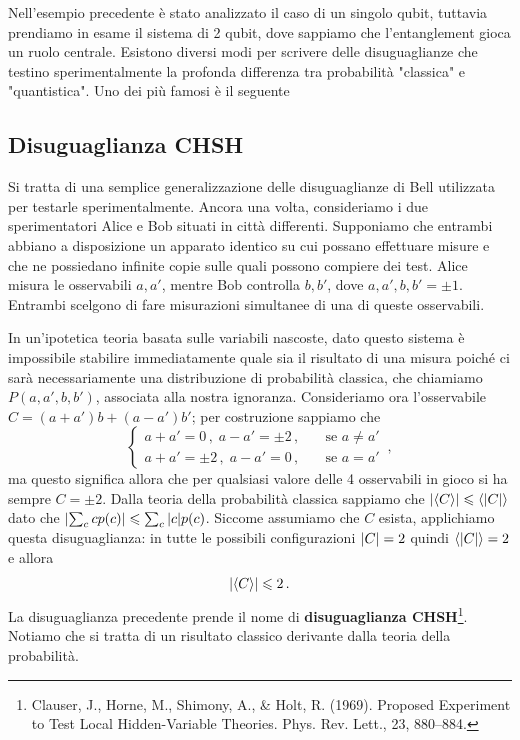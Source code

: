\noindent Nell'esempio precedente è stato analizzato il caso di un singolo qubit, tuttavia prendiamo in esame il sistema di 2 qubit, dove sappiamo che l'entanglement gioca un ruolo centrale. Esistono diversi modi per scrivere delle disuguaglianze che testino sperimentalmente la profonda differenza tra probabilità "classica" e "quantistica". Uno dei più famosi è il seguente

\subsection{Disuguaglianza CHSH}
Si tratta di una semplice generalizzazione delle disuguaglianze di Bell utilizzata per testarle sperimentalmente. Ancora una volta, consideriamo i due sperimentatori Alice e Bob situati in città differenti. Supponiamo che entrambi abbiano a disposizione un apparato identico su cui possano effettuare misure e che ne possiedano infinite copie sulle quali possono compiere dei test. Alice misura le osservabili $a,a'$, mentre Bob controlla $b,b'$, dove $a,a',b,b' = \pm 1$. Entrambi scelgono di fare misurazioni simultanee di una di queste osservabili.

\noindent In un'ipotetica teoria basata sulle variabili nascoste, dato questo sistema è impossibile stabilire immediatamente quale sia il risultato di una misura poiché ci sarà necessariamente una distribuzione di probabilità classica, che chiamiamo $P(a,a',b,b')$, associata alla nostra ignoranza. Consideriamo ora l'osservabile $ C = (a+a') b + (a-a') b'$; per costruzione sappiamo che
\begin{equation*}
    \begin{cases}
        a+a' = 0 \, , \; a-a' = \pm 2 \, , \quad &\text{se } a \neq a' \\
        a+a' = \pm 2 \, , \; a - a' = 0 \, , \quad &\text{se } a = a'
    \end{cases} \, , 
\end{equation*}
ma questo significa allora che per qualsiasi valore delle 4 osservabili in gioco si ha sempre $C = \pm 2$. Dalla teoria della probabilità classica sappiamo che $\abs{\expval{C}} \leqslant \expval{\abs{C}}$ dato che $\abs{\sum_c c p(c)} \leqslant \sum_c \abs{c} p(c)$. Siccome assumiamo che $C$ esista, applichiamo questa disuguaglianza: in tutte le possibili configurazioni $\abs{C} = 2$ quindi $\expval{\abs{C}} = 2$ e allora
\begin{equation}\label{CHSH_inequality}
    \abs{\expval{C}} \leqslant 2 \, .
\end{equation}
La disuguaglianza precedente prende il nome di \textbf{disuguaglianza CHSH}\footnote{Clauser, J., Horne, M., Shimony, A., \& Holt, R. (1969). Proposed Experiment to Test Local Hidden-Variable Theories. Phys. Rev. Lett., 23, 880–884.}. Notiamo che si tratta di un risultato classico derivante dalla teoria della probabilità. 

